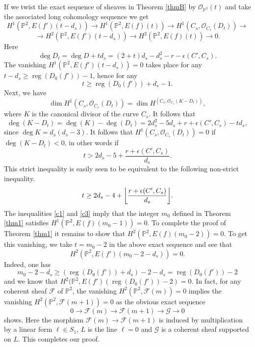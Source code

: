 \documentclass[12pt]{amsart}
\theoremstyle{plain}
\theoremstyle{definition}
\numberwithin{equation}{section}
\newcommand{\OO}{{\mathcal O}}
\newcommand{\F}{{\mathcal F}}
\newcommand{\G}{{\mathcal G}}
\newcommand{\PP}{\mathbb{P}}
\DeclareMathOperator{\reg}{reg}
\DeclarePairedDelimiter\floor{\lfloor}{\rfloor}
\begin{document}
If we twist the exact sequence of sheaves in Theorem \ref{thmB} by 
$\OO_{\PP^2}(t)$ and take the associated long cohomology sequence we get
$$H^1(\PP^2,E(f')(t-d_s)) \to H^1(\PP^2,E(f)(t)) \to H^1(C_s,\OO_{C_s}(D_t) )\to $$
$$\to H^2(\PP^2,E(f')(t-d_s)) \to H^2(\PP^2,E(f)(t)) \to 0.$$
Here 
$$\deg D_t=\deg D + td_s=(2+t)d_s-d_s^2-r -\epsilon(C',C_s).$$
The vanishing $H^1(\PP^2,E(f')(t-d_s))=0$ takes place for any
$t-d_s \geq \reg(D_0(f'))-1$, hence for any
\begin{equation}
\label{c1}
t \geq \reg(D_0(f'))+d_s-1.
\end{equation}
Next, we have
$$\dim H^1(C_s,\OO_{C_s}(D_t) )=\dim H^(C_s,\OO_{C_s}(K-D_t) ),$$
where $K$ is the canonical divisor of the curve $C_s$.
It follows that
$$\deg (K-D_t)=\deg(K)-\deg(D_t)=2d_s^2-5d_s+r+\epsilon(C',C_s)-td_s,$$
since $\deg K=d_s(d_s-3)$. It follows that $H^1(C_s,\OO_{C_s}(D_t) )=0$ if $\deg(K-D_t)<0$, in other words if
\begin{equation}
\label{c2}
t > 2d_s-5+\frac{r+\epsilon(C',C_s)}{d_s}.
\end{equation}
This strict inequality is easily  seen to be equivalent to the following
non-strict inequality.
\begin{equation}
\label{c3}
t \geq 2d_s-4+ \floor*{\frac{r+\epsilon(C',C_s)}{d_s}}.
\end{equation}
The inequalities \eqref{c1} and \eqref{c3} imply that the integer $m_0$ defined in Theorem \ref{thm1} satisfies $H^1(\PP^2,E(f)(m_0-1))=0$.
To complete the proof of Theorem \ref{thm1} it remains to show that
$H^2(\PP^2,E(f)(m_0-2))=0$. To get this vanishing, we take $t=m_0-2$ in the above exact sequence and see that 
$$H^2(\PP^2,E(f')(m_0-2-d_s))=0.$$
Indeed, one has 
$$m_0-2-d_s \geq (\reg(D_0(f'))+d_s)-2-d_s=\reg(D_0(f'))-2$$
and we know that $H^2(\PP^2,E(f')(\reg(D_0(f'))-2)=0$. In fact, for any coherent sheaf $\F$ of $\PP^2$, the vanishing $H^2(\PP^2,\F(m))=0$
implies the vanishing $H^2(\PP^2,\F(m+1))=0$ as the obvious exact sequence 
$$0 \to \F(m) \to \F(m+1) \to \G \to 0$$
shows. Here the morphism $\F(m) \to \F(m+1)$ is induced by multiplication by a linear form $\ell \in S_1$, $L$ is the line $\ell=0$ and
$\G$ is a coherent sheaf supported on $L$.
This completes our proof.
\end{document}

